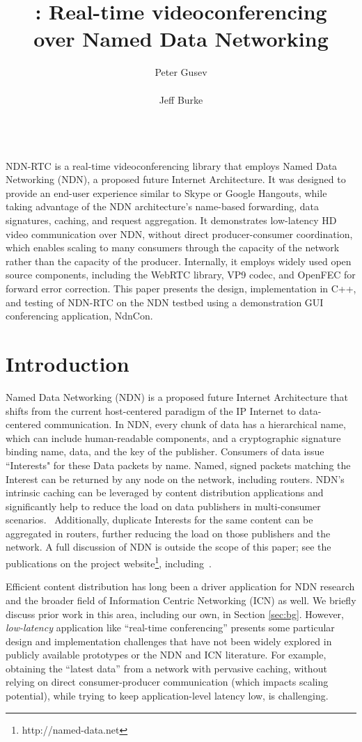 \documentclass{icn/sig-alternate-2012} %
\title{\ndnrtcName{}: Real-time videoconferencing\\ over Named Data Networking}
\author{
\alignauthor Peter Gusev\\
       \affaddr{UCLA REMAP}\\
       \email{peter@remap.ucla.edu}
\alignauthor Jeff Burke\\
       \affaddr{UCLA REMAP}\\
       \email{jburke@remap.ucla.edu}
}
\newcommand{\ndnrtcName}{NDN-RTC} %
\newcommand{\ndnconName}{NdnCon}
\begin{document}
\maketitle

\abstract
\ndnrtcName{} is a real-time videoconferencing library that employs Named Data Networking (NDN), a proposed future Internet Architecture. It was designed to provide an end-user experience similar to Skype or Google Hangouts, while taking advantage of the NDN architecture's name-based forwarding, data signatures, caching, and request aggregation. It demonstrates low-latency HD video communication over NDN, without direct producer-consumer coordination, which enables scaling to many consumers through the capacity of the network rather than the capacity of the producer. Internally, it employs widely used open source components, including the WebRTC library, VP9 codec, and OpenFEC for forward error correction. This paper presents the design, implementation in C++, and testing of \ndnrtcName{} on the NDN testbed using a demonstration GUI conferencing application, \ndnconName{}.

\section{Introduction}
Named Data Networking (NDN) is a proposed future Internet Architecture that shifts from the current host-centered paradigm of the IP Internet to data-centered communication. In NDN, every chunk of data has a hierarchical name, which can include human-readable components, and a cryptographic signature binding name, data, and the key of the publisher.  Consumers of data issue ``Interests" for these Data packets by name.  Named, signed packets matching the Interest can be returned by any node on the network, including routers. NDN's intrinsic caching can be leveraged by content distribution applications and significantly help to reduce the load on data publishers in multi-consumer scenarios.~\cite{ndnvideo}  Additionally, duplicate Interests for the same content can be aggregated in routers, further reducing the load on those publishers and the network. A full discussion of NDN is outside the scope of this paper; see the publications on the project website\footnote{http://named-data.net}, including~\cite{ndntechreport}.

Efficient content distribution has long been a driver application for NDN research and the broader field of Information Centric Networking (ICN) as well.  We briefly discuss prior work in this area, including our own, in Section \ref{sec:bg}.  However, \emph{low-latency} application like ``real-time conferencing'' presents some particular design and implementation challenges that have not been widely explored in publicly available prototypes or the NDN and ICN literature.   For example, obtaining the ``latest data'' from a network with pervasive caching, without relying on direct consumer-producer communication (which impacts scaling potential), while trying to keep application-level latency low, is challenging.
\end{document}

